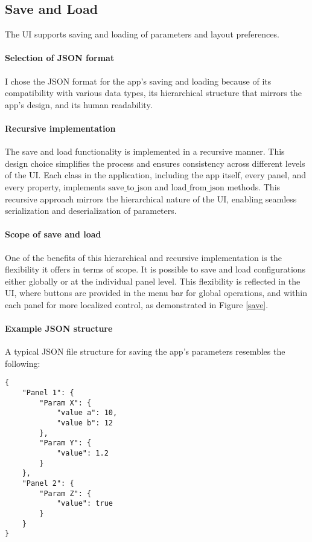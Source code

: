 \subsection{Save and Load}

The UI supports saving and loading of parameters and layout preferences.

\paragraph{Selection of JSON format}
I chose the JSON format for the app's saving and loading because of its compatibility with various data types, its hierarchical structure that mirrors the app's design, and its human readability.

\paragraph{Recursive implementation}
The save and load functionality is implemented in a recursive manner. This design choice simplifies the process and ensures consistency across different levels of the UI. Each class in the application, including the app itself, every panel, and every property, implements $\text{save\_to\_json}$ and $\text{load\_from\_json}$ methods. This recursive approach mirrors the hierarchical nature of the UI, enabling seamless serialization and deserialization of parameters.

\paragraph{Scope of save and load}
One of the benefits of this hierarchical and recursive implementation is the flexibility it offers in terms of scope. It is possible to save and load configurations either globally or at the individual panel level. This flexibility is reflected in the UI, where buttons are provided in the menu bar for global operations, and within each panel for more localized control, as demonstrated in Figure \ref{save}.

\paragraph{Example JSON structure}
A typical JSON file structure for saving the app's parameters resembles the following:

\begin{verbatim}
{
    "Panel 1": {
        "Param X": {
            "value a": 10,
            "value b": 12
        },
        "Param Y": {
            "value": 1.2
        }
    },
    "Panel 2": {
        "Param Z": {
            "value": true
        }
    }
}
\end{verbatim}


